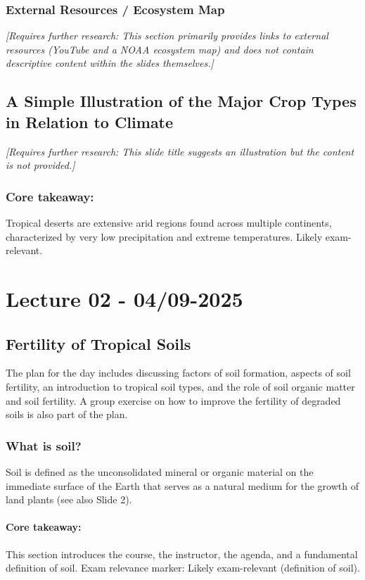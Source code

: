 \subsubsection{External Resources / Ecosystem Map} 
\textit{[Requires further research: This section primarily provides links to external resources (YouTube and a NOAA ecosystem map) and does not contain descriptive content within the slides themselves.]}

\subsection{A Simple Illustration of the Major Crop Types in Relation to Climate} 
\textit{[Requires further research: This slide title suggests an illustration but the content is not provided.]}

\subsubsection*{Core takeaway:} 
Tropical deserts are extensive arid regions found across multiple continents, characterized by very low precipitation and extreme temperatures. Likely exam-relevant.

\section{Lecture 02 - 04/09-2025}
\subsection{Fertility of Tropical Soils}
The plan for the day includes discussing factors of soil formation, aspects of soil fertility, an introduction to tropical soil types, and the role of soil organic matter and soil fertility. A group exercise on how to improve the fertility of degraded soils is also part of the plan.

\subsubsection{What is soil?} 
Soil is defined as the unconsolidated mineral or organic material on the immediate surface of the Earth that serves as a natural medium for the growth of land plants (see also Slide 2).

\paragraph*{Core takeaway:} This section introduces the course, the instructor, the agenda, and a fundamental definition of soil. Exam relevance marker: Likely exam-relevant (definition of soil).


